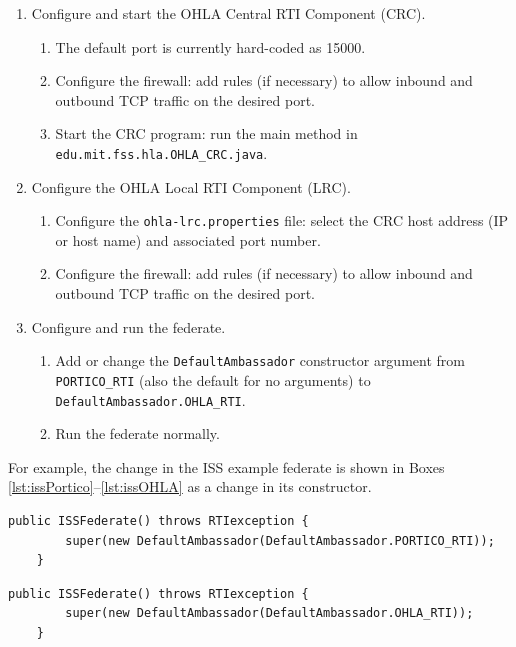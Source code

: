 \documentclass[]{article}
\begin{document}
\begin{enumerate}
\item Configure and start the OHLA Central RTI Component (CRC).
\begin{enumerate}
\item The default port is currently hard-coded as 15000.
\item Configure the firewall: add rules (if necessary) to allow inbound and outbound TCP traffic on the desired port.
\item Start the CRC program: run the main method in \texttt{edu.mit.fss.hla.OHLA\_CRC.java}.
\end{enumerate}
\item Configure the OHLA Local RTI Component (LRC).
\begin{enumerate}
\item Configure the \texttt{ohla-lrc.properties} file: select the CRC host address (IP or host name) and associated port number.
\item Configure the firewall: add rules (if necessary) to allow inbound and outbound TCP traffic on the desired port.
\end{enumerate}
\item Configure and run the federate.
\begin{enumerate}
\item Add or change the \texttt{DefaultAmbassador} constructor argument from \texttt{PORTICO\_RTI} (also the default for no arguments) to \texttt{DefaultAmbassador.OHLA\_RTI}.
\item Run the federate normally.
\end{enumerate}
\end{enumerate}

For example, the change in the ISS example federate is shown in Boxes \ref{lst:issPortico}--\ref{lst:issOHLA} as a change in its constructor.

\begin{Code}
\begin{lstlisting}[caption={ISSFederate constructor with Portico RTI},label={lst:issPortico}]
	public ISSFederate() throws RTIexception {
		super(new DefaultAmbassador(DefaultAmbassador.PORTICO_RTI));
	}
\end{lstlisting}

\begin{lstlisting}[caption={ISSFederate constructor with OHLA RTI},label={lst:issOHLA}]
	public ISSFederate() throws RTIexception {
		super(new DefaultAmbassador(DefaultAmbassador.OHLA_RTI));
	}
\end{lstlisting}
\end{Code}
\end{document}
